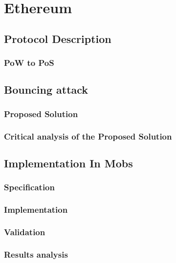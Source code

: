 
%

\chapter{Ethereum}\label{cha:ethereum}

\section{Protocol Description}\label{sub:protocol_description}

\subsection{PoW to PoS}\label{sub:pow_to_pos}

\section{Bouncing attack}\label{sub:bouncing_attack}

\subsection{Proposed Solution}\label{sub:proposed_patch}
\subsection{Critical analysis of the Proposed Solution}\label{sub:critical_analysis_of_the_proposed_patch}

\section{Implementation In Mobs}\label{sub:implementation_in_mobs}
\subsection{Specification}\label{sub:}
\subsection{Implementation}\label{sub:}
\subsection{Validation}\label{sub:}

\subsection{Results analysis}\label{sub:result_analysis}
